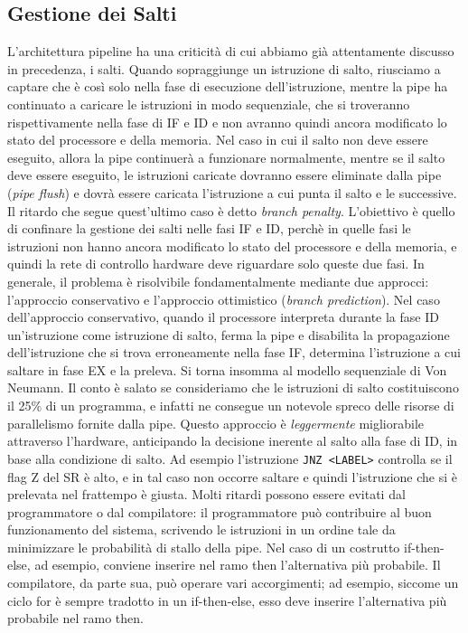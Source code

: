 \subsection{Gestione dei Salti} \label{par:MIPS_gestione_salti}
L'architettura pipeline ha una criticità di cui abbiamo già attentamente discusso in precedenza, i salti. 
Quando sopraggiunge un istruzione di salto, riusciamo a captare che è così solo nella fase di esecuzione dell'istruzione, mentre la pipe ha continuato a caricare le istruzioni in modo sequenziale, che si troveranno rispettivamente nella fase di IF e ID e non avranno quindi ancora modificato lo stato del processore e della memoria. Nel caso in cui il salto non deve essere eseguito, allora la pipe continuerà a funzionare normalmente, mentre se il salto deve essere eseguito, le istruzioni caricate dovranno essere eliminate dalla pipe (\textit{pipe flush}) e dovrà essere caricata l'istruzione a cui punta il salto e le successive. Il ritardo che segue quest'ultimo caso è detto \textit{branch penalty}. L'obiettivo è quello di confinare la gestione dei salti nelle fasi IF e ID, perchè in quelle fasi le istruzioni non hanno ancora modificato lo stato del processore e della memoria, e quindi la rete di controllo hardware deve riguardare solo queste due fasi.
In generale, il problema è risolvibile fondamentalmente mediante due approcci: l'approccio conservativo e l'approccio ottimistico (\textit{branch prediction}).
Nel caso dell'approccio conservativo, quando il processore interpreta durante la fase ID un'istruzione come istruzione di salto, ferma la pipe e disabilita la propagazione dell'istruzione che si trova erroneamente nella fase IF, determina l'istruzione a cui saltare in fase EX e la preleva. Si torna insomma al modello sequenziale di Von Neumann. Il conto è salato se consideriamo che le istruzioni di salto costituiscono il 25\% di un programma, e infatti ne consegue un notevole spreco delle risorse di parallelismo fornite dalla pipe. Questo approccio è \textit{leggermente} migliorabile attraverso l'hardware, anticipando la decisione inerente al salto alla fase di ID, in base alla condizione di salto. Ad esempio l'istruzione \lstinline|JNZ <LABEL>| controlla se il flag Z del SR è alto, e in tal caso non occorre saltare e quindi l'istruzione che si è prelevata nel frattempo è giusta. Molti ritardi possono essere  evitati dal programmatore o dal compilatore: il programmatore può contribuire al buon funzionamento del sistema, scrivendo le istruzioni in un ordine tale da minimizzare le probabilità di stallo della pipe. Nel caso di un costrutto if-then-else, ad esempio, conviene inserire nel ramo then l'alternativa più probabile. Il compilatore, da parte sua, può operare vari accorgimenti; ad esempio, siccome un ciclo for è sempre tradotto in un if-then-else, esso deve inserire l'alternativa più probabile nel ramo then.
